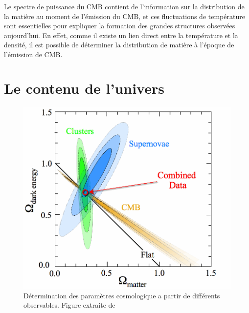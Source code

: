 
Le spectre de puissance du \ac{CMB} contient de l'information sur la distribution de la matière au moment de l'émission du \ac{CMB}, et ces fluctuations de température sont essentielles pour expliquer la formation des grandes structures observées aujourd'hui.
En effet, comme il existe un lien direct entre la température et la densité, il est possible de déterminer la distribution de matière à l'époque de l'émission de \ac{CMB}.

\section{Le contenu de l'univers}
\label{cosmoparam}

\begin{figure}
        \includegraphics[width=.95\linewidth]{img/01/cosmoparam.png} 
        \caption[Determination des paramètres cosmologique]{Détermination des paramètres cosmologique a partir de différents observables. Figure extraite de \cite{2008ApJ...686..749K}}
 		\label{fig:cosmoparam}
\end{figure}


